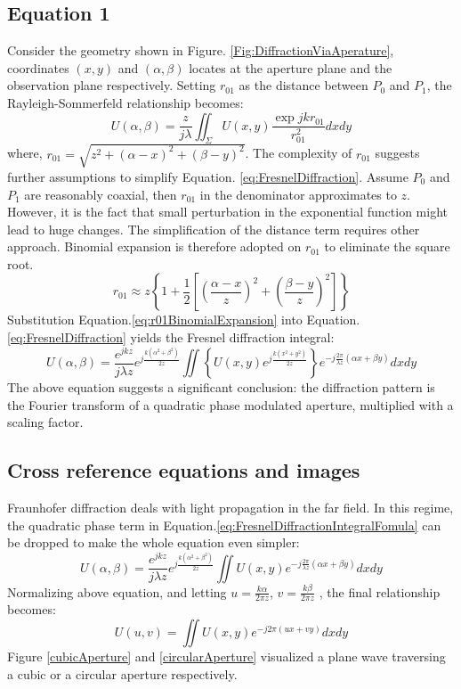 \subsection{Equation 1}
Consider the geometry shown in Figure. \ref{Fig:DiffractionViaAperature}, coordinates $(x, y)$ and $(\alpha,\beta)$ locates at the aperture plane and the observation plane respectively. Setting $r_{01}$ as the distance between $P_0$ and $P_1$, the Rayleigh-Sommerfeld relationship becomes:
\begin{equation}
	U(\alpha, \beta) = \frac{z}{j\lambda}\iint_\Sigma U(x, y)\frac{\exp{jkr_{01}}}{r_{01}^2}dxdy
	\label{eq:FresnelDiffraction}
\end{equation}
where, $r_{01} = \sqrt{z^2+(\alpha - x)^2+(\beta-y)^2}$. The complexity of $r_{01}$ suggests further assumptions to simplify Equation. \ref{eq:FresnelDiffraction}. Assume $P_0$ and $P_1$ are reasonably coaxial, then $r_{01}$ in the denominator approximates to $z$. However, it is the fact that small perturbation in the exponential function might lead to huge changes. The simplification of the distance term requires other approach. Binomial expansion is therefore adopted on $r_{01}$ to eliminate the square root.
\begin{equation}
	r_{01} \approx z\left\{1+\frac{1}{2}  \left[\left(\frac{\alpha-x}{z}\right)^2+\left(\frac{\beta-y}{z}\right)^2 \right]\right\}
	\label{eq:r01BinomialExpansion}
\end{equation} 
Substitution Equation.\ref{eq:r01BinomialExpansion} into Equation.\ref{eq:FresnelDiffraction} yields the Fresnel diffraction integral:
\begin{equation}
	U(\alpha, \beta) = \frac{e^{jkz}}{j\lambda z}e^{j\frac{k(\alpha^2+\beta^2)}{2z}}\iint\left\{U(x,y)e^{j\frac{k(x^2+y^2)}{2z}}\right\}e^{-j\frac{2\pi}{\lambda z}(\alpha x+\beta y)}dxdy
	\label{eq:FresnelDiffractionIntegralFomula}
\end{equation}
The above equation suggests a significant conclusion: the diffraction pattern is the Fourier transform of a quadratic phase modulated aperture, multiplied with a scaling factor.

\subsection{Cross reference equations and images}
Fraunhofer diffraction deals with light propagation in the far field. In this regime, the quadratic phase term in Equation.\ref{eq:FresnelDiffractionIntegralFomula} can be dropped to make the whole equation even simpler:
\begin{equation}
	U(\alpha, \beta) = \frac{e^{jkz}}{j\lambda z}e^{j\frac{k(\alpha^2+\beta^2)}{2z}}\iint U(x,y)e^{-j\frac{2\pi}{\lambda z}(\alpha x+\beta y)}dxdy
	\label{eq:FraunhoferDiffractionFormula}
\end{equation}
Normalizing above equation, and letting $u = \frac{k\alpha}{2\pi z}$, $v = \frac{k\beta}{2\pi z}$ \cite{4B11}, the final relationship becomes:
\begin{equation}
	U(u,v) = \iint U(x,y)e^{-j2\pi(ux+vy)}dxdy
	\label{FourierTransformOfLight}
\end{equation}
Figure \ref{cubicAperture} and \ref{circularAperture} visualized a plane wave traversing a cubic or a circular aperture respectively.
